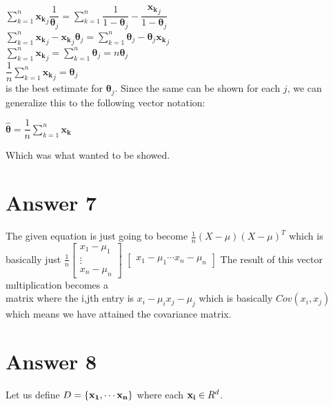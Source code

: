 \documentclass[12pt]{article}
\begin{document}
$ \sum_{k=1}^{n} \boldsymbol{x_k}_j \dfrac{1}{\boldsymbol{\theta}_j} = \sum_{k=1}^{n} \dfrac{1}{1-\boldsymbol{\theta}_j} - \dfrac{\boldsymbol{x_k}_j}{1-\boldsymbol{\theta}_j} $ \\


$ \sum_{k=1}^{n} \boldsymbol{x_k}_j - \boldsymbol{x_k}_j
 \boldsymbol{\theta }_j = \sum_{k=1}^{n} \boldsymbol{\theta}_j - \boldsymbol{\theta}_j \boldsymbol{x_k}_j $ \\
 
 $ \sum_{k=1}^{n} \boldsymbol{x_k}_j  = \sum_{k=1}^{n} \boldsymbol{\theta}_j = n\boldsymbol{\theta}_j $ \\
 
 $ \dfrac{1}{n} \sum_{k=1}^{n} \boldsymbol{x_k}_j  = \boldsymbol{\theta}_j $ \\
 
 is the best estimate for $\boldsymbol{\theta}_j$. Since the same can be shown for each $j$, we can generalize this to the following vector notation:
 
 $ \boldsymbol{\hat{\boldsymbol{\theta}}} = \dfrac{1}{n} \sum_{k=1}^{n} \boldsymbol{x_k}   $
 
 Which was what wanted to be showed.



\section*{Answer 7}

The given equation is just going to become $\frac{1}{n}(X-\mu )(X-\mu )^{T}$ which is basically just $\frac{1}{n}\begin{bmatrix}
    x_{1}-\mu_{1}\\
    \vdots\\
     x_{n}-\mu_{n}
\end{bmatrix}
$
$\begin{bmatrix}
    x_{1}-\mu_{1}
    \cdots
     x_{n}-\mu_{n}
\end{bmatrix}
$ The result of this vector mıltiplication becomes a \\matrix where the i,jth entry is $x_{i}-\mu_{i}x_{j}-\mu_{j}$ which is basically $Cov(x_{i},x_{j})$ which means we have attained the covariance matrix.


\section*{Answer 8}

\quad Let us define $D=\{\bold{x_1},\cdots\bold{x_n}\}$ where each $\bold{x_i}\in R^d$. \\
\end{document}
